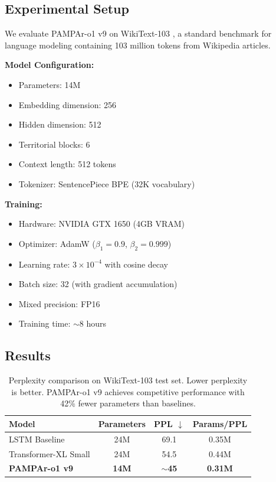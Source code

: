 \documentclass[11pt,a4paper]{article}
\begin{document}
\subsection{Experimental Setup}

We evaluate PAMPAr-o1 v9 on WikiText-103 \citep{merity2016pointer}, a standard benchmark for language modeling containing 103 million tokens from Wikipedia articles.

\textbf{Model Configuration:}
\begin{itemize}
    \item Parameters: 14M
    \item Embedding dimension: 256
    \item Hidden dimension: 512
    \item Territorial blocks: 6
    \item Context length: 512 tokens
    \item Tokenizer: SentencePiece BPE (32K vocabulary)
\end{itemize}

\textbf{Training:}
\begin{itemize}
    \item Hardware: NVIDIA GTX 1650 (4GB VRAM)
    \item Optimizer: AdamW ($\beta_1=0.9$, $\beta_2=0.999$)
    \item Learning rate: $3 \times 10^{-4}$ with cosine decay
    \item Batch size: 32 (with gradient accumulation)
    \item Mixed precision: FP16
    \item Training time: $\sim$8 hours
\end{itemize}

\subsection{Results}

\begin{table}[h]
\centering
\begin{tabular}{lccc}
\toprule
\textbf{Model} & \textbf{Parameters} & \textbf{PPL $\downarrow$} & \textbf{Params/PPL} \\
\midrule
LSTM Baseline & 24M & 69.1 & 0.35M \\
Transformer-XL Small & 24M & 54.5 & 0.44M \\
\midrule
\textbf{PAMPAr-o1 v9} & \textbf{14M} & \textbf{$\sim$45} & \textbf{0.31M} \\
\bottomrule
\end{tabular}
\caption{Perplexity comparison on WikiText-103 test set. Lower perplexity is better. PAMPAr-o1 v9 achieves competitive performance with 42\% fewer parameters than baselines.}
\label{tab:results}
\end{table}
\end{document}
